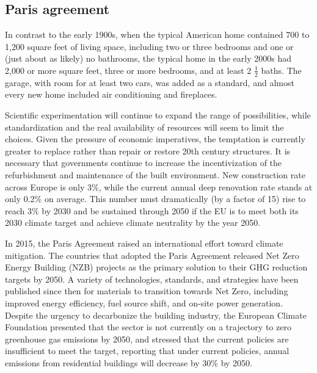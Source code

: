 \subsection{Paris agreement}
\label{sec:paris_agreement}

In contrast to the early 1900s, when the typical American home contained 700 to 1,200 square feet of living space, including two or three bedrooms and one or (just about as likely) no bathrooms, the typical home in the early 2000s had 2,000 or more square feet, three or more bedrooms, and at least 2 \(\frac{1}{2}\) baths. The garage, with room for at least two cars, was added as a standard, and almost every new home included air conditioning and fireplaces.\autocite{friedman2005peeking}

Scientific experimentation will continue to expand the range of possibilities, while standardization and the real availability of resources will seem to limit the choices.\autocite{krausmann2009growth} Given the pressure of economic imperatives, the temptation is currently greater to replace rather than repair or restore 20th century structures.\autocite{jester2014twentieth} It is necessary that governments continue to increase the incentivization of the refurbishment and maintenance of the built environment. New construction rate across Europe is only 3\%,\autocite{honic2021material} while the current annual deep renovation rate stands at only 0.2\% on average. This number must dramatically (by a factor of 15) rise to reach 3\% by 2030 and be sustained through 2050 if the EU is to meet both its 2030 climate target and achieve climate neutrality by the year 2050.\autocite{sibileau2021deep}

In 2015, the Paris Agreement raised an international effort toward climate mitigation. The countries that adopted the Paris Agreement released Net Zero Energy Building (NZB) projects as the primary solution to their GHG reduction targets by 2050. A variety of technologies, standards, and strategies have been published since then for materials to transition towards Net Zero, including improved energy efficiency, fuel source shift, and on-site power generation.\autocite{moghaddasi2021net} Despite the urgency to decarbonize the building industry, the European Climate Foundation presented that the sector is not currently on a trajectory to zero greenhouse gas emissions by 2050, and stressed that the current policies are insufficient to meet the target, reporting that under current policies, annual emissions from residential buildings will decrease by 30\% by 2050.\autocite{ECF_2020} 

